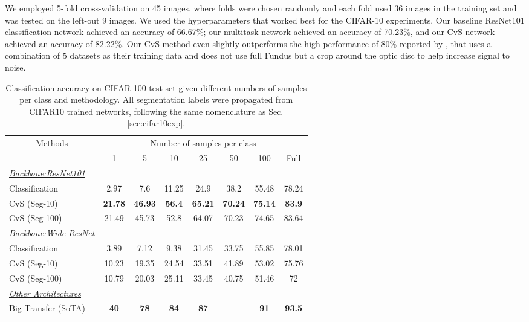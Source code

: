 \documentclass[conference]{IEEEtran}
\begin{document}
We employed 5-fold cross-validation on 45 images, where folds were chosen randomly and each fold used 36 images in the training set and was tested on the left-out 9 images. We used the hyperparameters that worked best for the CIFAR-10 experiments. Our baseline ResNet101 classification network achieved an accuracy of 66.67\%; our multitask network achieved an accuracy of 70.23\%, and our CvS network achieved an accuracy of 82.22\%. Our CvS method even slightly outperforms the high performance of 80\% reported by \cite{diaz2019cnns}, that uses a combination of $5$ datasets as their training data and does not use full Fundus but a crop around the optic disc to help increase signal to noise.
%
\begin{table*}[htb]
\small
\centering
\caption{Classification accuracy on CIFAR-100 test set given different numbers of samples per class and methodology. All segmentation labels were propagated from CIFAR10 trained networks, following the same nomenclature as Sec.\ref{sec:cifar10exp}.}
\label{tab:cifar100-res}
\begin{tabular}{lccccccc}
\hline
\multicolumn{1}{c}{\multirow{2}{*}{Methods}} & \multicolumn{7}{c}{Number of samples per class} \\ \cline{2-8} 
\multicolumn{1}{c}{} & 1 & 5 & 10 & 25 & 50 & 100 & Full \\ \hline
{\ul \textit{Backbone:ResNet101}} &  &  &  &  &  &  &  \\
Classification & 2.97 & 7.6 & 11.25 & 24.9 & 38.2 & 55.48 & 78.24 \\
CvS (Seg-10) & \textbf{21.78} & \textbf{46.93} & \textbf{56.4} & \textbf{65.21} & \textbf{70.24} & \textbf{75.14} & \textbf{83.9} \\
CvS (Seg-100) & 21.49 & 45.73 & 52.8 & 64.07 & 70.23 & 74.65 & 83.64 \\ \hline
{\ul \textit{Backbone:Wide-ResNet}} &  &  &  &  &  &  &  \\
Classification & 3.89 & 7.12 & 9.38 & 31.45 & 33.75 & 55.85 & 78.01 \\
CvS (Seg-10) & 10.23 & 19.35 & 24.54 & 33.51 & 41.89 & 53.02 & 75.76 \\
CvS (Seg-100) & 10.79 & 20.03 & 25.11 & 33.45 & 40.75 & 51.46 & 72 \\ \hline
{\ul \textit{Other Architectures}} &  &  &  &  &  &  &  \\
Big Transfer (SoTA) & \textbf{40} & \textbf{78} & \textbf{84} & \textbf{87} & - & \textbf{91} & \textbf{93.5} \\ \hline
\end{tabular}
\end{table*}
\end{document}
